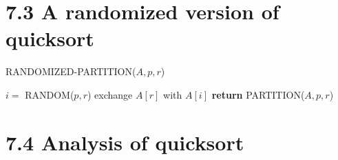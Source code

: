 \documentclass[a4paper]{article}
\begin{document}
\section*{7.3 A randomized version of quicksort}
\begin{algorithm}[H]%
    \caption{RANDOMIZED-PARTITION($A,p,r$)}
    \begin{algorithmic}[1] %
        \State $i=$ RANDOM($p,r$)
        \State exchange $A[r]$ with $A[i]$
        \State \textbf{return }PARTITION($A,p,r$)
    \end{algorithmic}
\end{algorithm}
\section*{7.4 Analysis of quicksort}
\end{document}

